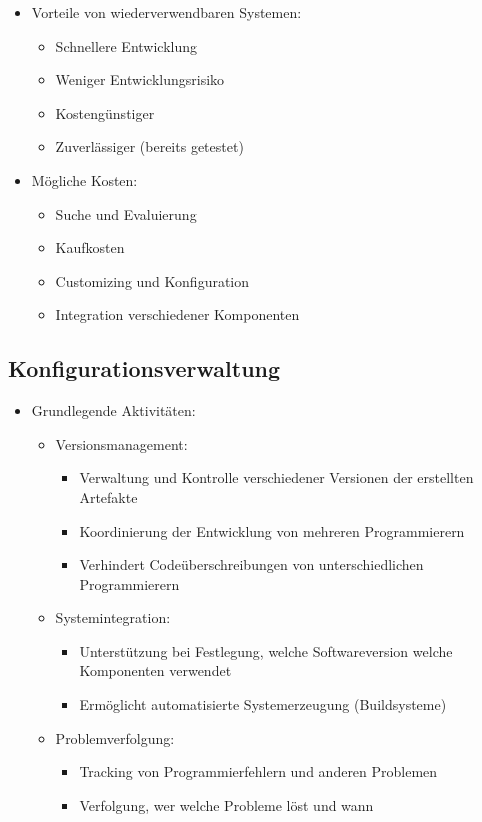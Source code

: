 \documentclass[11pt, a4paper]{article}
\begin{document}
\begin{itemize}
    \item Vorteile von wiederverwendbaren Systemen:
    \begin{itemize}
        \item Schnellere Entwicklung
        \item Weniger Entwicklungsrisiko
        \item Kostengünstiger
        \item Zuverlässiger (bereits getestet)
    \end{itemize}
    \item Mögliche Kosten:
    \begin{itemize}
        \item Suche und Evaluierung
        \item Kaufkosten
        \item Customizing und Konfiguration
        \item Integration verschiedener Komponenten
    \end{itemize}
\end{itemize}


\raggedright \subsection{Konfigurationsverwaltung}

\begin{itemize}
    \item Grundlegende Aktivitäten:
    \begin{itemize}
        \item Versionsmanagement:
        \begin{itemize}
            \item Verwaltung und Kontrolle verschiedener Versionen der erstellten Artefakte
            \item Koordinierung der Entwicklung von mehreren Programmierern
            \item Verhindert Codeüberschreibungen von unterschiedlichen Programmierern
        \end{itemize}
        \item Systemintegration:
        \begin{itemize}
            \item Unterstützung bei Festlegung, welche Softwareversion welche Komponenten verwendet
            \item Ermöglicht automatisierte Systemerzeugung (Buildsysteme)
        \end{itemize}
        \item Problemverfolgung:
        \begin{itemize}
            \item Tracking von Programmierfehlern und anderen Problemen
            \item Verfolgung, wer welche Probleme löst und wann
        \end{itemize}
    \end{itemize}
\end{itemize}
\end{document}
